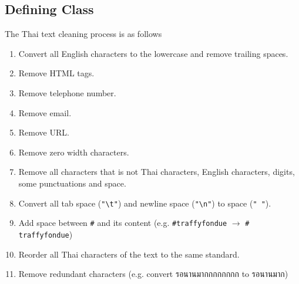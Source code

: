 \documentclass[12pt, a4paper]{article}
\begin{document}
            \subsection{Defining Class}
                The Thai text cleaning process is as follows
                \begin{enumerate}
                    \item Convert all English characters to the lowercase and remove trailing spaces.
                    \item Remove HTML tags.
                    \item Remove telephone number.
                    \item Remove email.
                    \item Remove URL.
                    \item Remove zero width characters.
                    \item Remove all characters that is not Thai characters, English characters, digits,
                    some punctuations and space.
                    \item Convert all tab space (\texttt{"\textbackslash t"}) and newline space (\texttt{"\textbackslash n"}) to space (\texttt{" "}).
                    \item Add space between \texttt{\#} and its content (e.g. \texttt{\#traffyfondue} $\rightarrow$ \texttt{\# traffyfondue})
                    \item Reorder all Thai characters of the text to the same standard.
                    \item Remove redundant characters (e.g. convert รอนานมากกกกกกกก to รอนานมาก)
                \end{enumerate}
\end{document}
